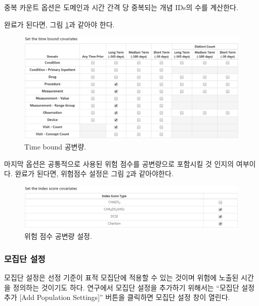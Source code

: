 \documentclass[11pt]{book}
\theoremstyle{definition}
\theoremstyle{definition}
\theoremstyle{definition}
\theoremstyle{remark}
\begin{document}
중복 카운트 옵션은 도메인과 시간 간격 당 중복되는 개념 IDs의 수를
계산한다.

완료가 된다면, 그림 \ref{fig:covariateSettings5}과 같아야 한다.

\begin{figure}

{\centering \includegraphics[width=1\linewidth]{images/PatientLevelPrediction/covariateSettings5} 

}

\caption{Time bound 공변량.}\label{fig:covariateSettings5}
\end{figure}

마지막 옵션은 공통적으로 사용된 위험 점수를 공변량으로 포함시킬 것
인지의 여부이다. 완료가 된다면, 위험점수 설정은 그림
\ref{fig:covariateSettings6}과 같아야한다.

\begin{figure}

{\centering \includegraphics[width=1\linewidth]{images/PatientLevelPrediction/covariateSettings6} 

}

\caption{위험 점수 공변량 설정.}\label{fig:covariateSettings6}
\end{figure}

\subsubsection*{모집단 설정}\label{-}

모집단 설정은 선정 기준이 표적 모집단에 적용할 수 있는 것이며 위험에
노출된 시간을 정의하는 것이기도 하다. 연구에서 모집단 설정을 추가하기
위해서는 ``모집단 설정 추가 {[}Add Population Settings{]}'' 버튼을
클릭하면 모집단 설정 창이 열린다.
\end{document}
